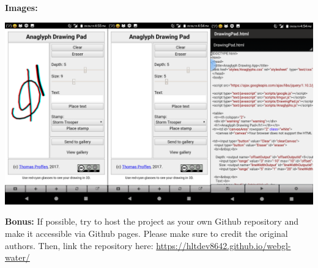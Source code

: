 \documentclass[10pt,oneside,onecolumn,letterpaper]{article}
\begin{document}
\vspace{.5cm}

\break

\noindent\textbf{Images:}

\vspace{.5cm}

\noindent\includegraphics[width=\textwidth]{gfx/anaglyphweb_merged.png}

\vspace{.5cm}

\noindent\textbf{Bonus:} If possible, try to host the project as your own Github repository and make it accessible via Github pages. Please make sure to credit the original authors. Then, link the repository here: \url{https://hltdev8642.github.io/webgl-water/}
\end{document}
